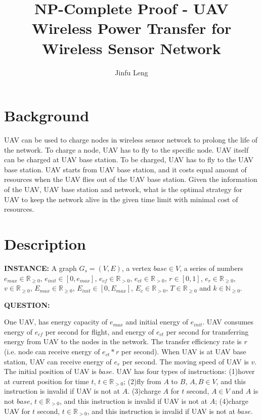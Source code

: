 \documentclass[11pt]{article}
\begin{document}
\title{NP-Complete Proof - UAV Wireless Power Transfer for Wireless Sensor Network}
\author{Jinfu Leng}
\maketitle
\section{Background}
UAV can be used to charge nodes in wireless sensor network to prolong the life of the network. To charge a node, UAV has to fly to the specific node. UAV itself can be charged at UAV base station. To be charged, UAV has to fly to the UAV base station. UAV starts from UAV base station, and it costs equal amount of resources when the UAV flies out of the UAV base station. Given the information of the UAV, UAV base station and network, what is the optimal strategy for UAV to keep the network alive in the given time limit with minimal cost of resources.

\section{Description}
\noindent
\textbf{INSTANCE:} 
A graph $G_s = (V, E)$, a vertex $base \in V$, a series of numbers $e_{max} \in \mathbb{R}_{\geq0}$, $e_{init} \in [0, e_{max}]$, $e_{cf} \in \mathbb{R}_{>0}$, $e_{ct} \in \mathbb{R}_{>0}$, $r \in [0, 1]$, $e_r \in \mathbb{R}_{\geq0}$, $v \in \mathbb{R}_{\geq0}$, $E_{max} \in \mathbb{R}_{\geq0}$, $E_{init} \in [0, E_{max}]$, $E_{c} \in \mathbb{R}_{>0}$, $T \in \mathbb{R}_{\geq0}$ and $k \in \mathbb{N}_{\geq0}$.

\noindent
\textbf{QUESTION:}

One UAV, has energy capacity of $e_{max}$ and initial energy of $e_{init}$. UAV consumes energy of $e_{cf}$ per second for flight, and energy of $e_{ct}$ per second for transferring energy from UAV to the nodes in the network. The transfer efficiency rate is $r$ (i.e. node can receive energy of $e_{ct}*r$ per second). When UAV is at UAV base station, UAV can receive energy of $e_r$ per second. The moving speed of UAV is $v$. The initial position of UAV is $base$. UAV has four types of instructions: (1)hover at current position for time $t$, $t \in \mathbb{R}_{>0}$; (2)fly from $A$ to $B$, $A,B \in V$, and this instruction is invalid if UAV is not at $A$. (3)charge $A$ for $t$ second, $A \in V$ and $A$ is not $base$, $t \in \mathbb{R}_{>0}$, and this instruction is invalid if UAV is not at $A$; (4)charge UAV for $t$ second, $t \in \mathbb{R}_{>0}$, and this instruction is invalid if UAV is not at $base$.
\end{document}
